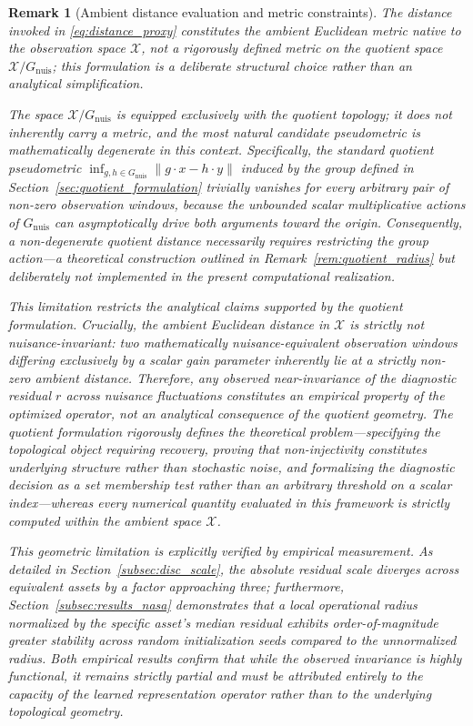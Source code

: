 \documentclass[a4paper]{cas-sc}
\newtheorem{remark}{Remark}
\newcommand{\X}{\ensuremath{\mathcal{X}}}
\newcommand{\Gnuis}{\ensuremath{G_{\mathrm{nuis}}}}
\newcommand{\quotient}{\ensuremath{\mathcal{X}/G_{\mathrm{nuis}}}}
\newcommand{\residual}{\ensuremath{r}}
\begin{document}
\begin{remark}[Ambient distance evaluation and metric constraints]
\label{rem:distance_lives_in_X}
The distance invoked in \eqref{eq:distance_proxy} constitutes the ambient Euclidean metric native to the observation space \(\X\), not a rigorously defined metric on the quotient space \(\quotient\); this formulation is a deliberate structural choice rather than an analytical simplification.

The space \(\quotient\) is equipped exclusively with the quotient topology; it does not inherently carry a metric, and the most natural candidate pseudometric is mathematically degenerate in this context. Specifically, the standard quotient pseudometric \(\inf_{g,h\in\Gnuis}\lVert g\cdot x - h\cdot y\rVert\) induced by the group defined in Section~\ref{sec:quotient_formulation} trivially vanishes for every arbitrary pair of non-zero observation windows, because the unbounded scalar multiplicative actions of \(\Gnuis\) can asymptotically drive both arguments toward the origin. Consequently, a non-degenerate quotient distance necessarily requires restricting the group action---a theoretical construction outlined in Remark~\ref{rem:quotient_radius} but deliberately not implemented in the present computational realization.

This limitation restricts the analytical claims supported by the quotient formulation. Crucially, the ambient Euclidean distance in \(\X\) is strictly \emph{not} nuisance-invariant: two mathematically nuisance-equivalent observation windows differing exclusively by a scalar gain parameter inherently lie at a strictly non-zero ambient distance. Therefore, any observed near-invariance of the diagnostic residual \(\residual\) across nuisance fluctuations constitutes an \emph{empirical property of the optimized operator}, not an analytical consequence of the quotient geometry. The quotient formulation rigorously defines the theoretical problem---specifying the topological object requiring recovery, proving that non-injectivity constitutes underlying structure rather than stochastic noise, and formalizing the diagnostic decision as a set membership test rather than an arbitrary threshold on a scalar index---whereas every numerical quantity evaluated in this framework is strictly computed within the ambient space \(\X\).

This geometric limitation is explicitly verified by empirical measurement. As detailed in Section~\ref{subsec:disc_scale}, the absolute residual scale diverges across equivalent assets by a factor approaching three; furthermore, Section~\ref{subsec:results_nasa} demonstrates that a local operational radius normalized by the specific asset's median residual exhibits order-of-magnitude greater stability across random initialization seeds compared to the unnormalized radius. Both empirical results confirm that while the observed invariance is highly functional, it remains strictly partial and must be attributed entirely to the capacity of the learned representation operator rather than to the underlying topological geometry.
\end{remark}
\end{document}
